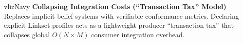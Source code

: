 \documentclass[
  25pt,
  a0paper,
  portrait,
  margin=0mm,
  innermargin=16mm,
  blockverticalspace=7mm,
  colspace=16mm,
  subcolspace=8mm
]{tikzposter}
\begin{document}
\begin{columns}
{    \noindent
    \begin{minipage}{\linewidth}
      \begin{tactilecard}[height=5.70cm,valign=center]{vlizNavy}
        {\fontsize{25pt}{29pt}\selectfont\color{vlizDeepNavy}\bfseries Collapsing Integration Costs (``Transaction Tax'' Model)}\\[5pt]
        Replaces implicit belief systems with verifiable conformance metrics. Declaring explicit Linkset profiles acts as a lightweight producer ``transaction tax'' that collapses global $O(N \times M)$ consumer integration overhead.
      \end{tactilecard}
    \end{minipage}
  }



\end{columns}
\end{document}
